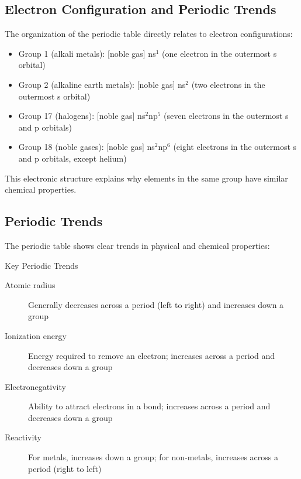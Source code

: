 \subsection{Electron Configuration and Periodic Trends}

The organization of the periodic table directly relates to electron configurations:

\begin{itemize}
    \item Group 1 (alkali metals): [noble gas] ns$^1$ (one electron in the outermost s orbital)
    \item Group 2 (alkaline earth metals): [noble gas] ns$^2$ (two electrons in the outermost s orbital)
    \item Group 17 (halogens): [noble gas] ns$^2$np$^5$ (seven electrons in the outermost s and p orbitals)
    \item Group 18 (noble gases): [noble gas] ns$^2$np$^6$ (eight electrons in the outermost s and p orbitals, except helium)
\end{itemize}

This electronic structure explains why elements in the same group have similar chemical properties.

\subsection{Periodic Trends}

The periodic table shows clear trends in physical and chemical properties:

\begin{keyconcept}{Key Periodic Trends}
\begin{description}
    \item[Atomic radius] Generally decreases across a period (left to right) and increases down a group
    \item[Ionization energy] Energy required to remove an electron; increases across a period and decreases down a group
    \item[Electronegativity] Ability to attract electrons in a bond; increases across a period and decreases down a group
    \item[Reactivity] For metals, increases down a group; for non-metals, increases across a period (right to left)
\end{description}
\end{keyconcept}


